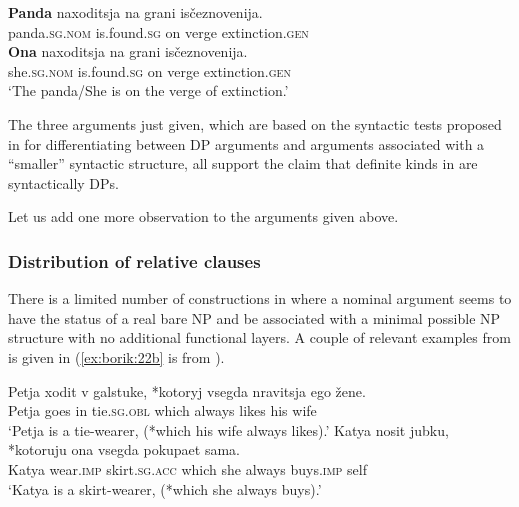 \documentclass[output=paper
,modfonts
,nonflat]{langsci/langscibook}
\begin{document}
	\ea\label{ex:borik:21}
	\ea\label{ex:borik:21a}	
	\gll \textbf{Panda}	naxoditsja		na		grani		is\v{c}eznovenija.\\
	panda.\textsc{sg.nom}		is.found.\textsc{sg} on		verge		extinction.\textsc{gen}\\
	\ex\label{ex:borik:21b}
	\gll \textbf{Ona} 	naxoditsja		na		grani		is\v{c}eznovenija.\\
	she.\textsc{sg.nom} 		is.found.\textsc{sg} on		verge		extinction.\textsc{gen}	\\
	\glt `The panda/She is on the verge of extinction.'
	\z
	\z
	
	The three arguments just given, which are based on the syntactic tests proposed in \citet{Pereltsvaig2006} for differentiating between DP arguments and arguments associated with a ``smaller'' syntactic structure, all support the claim that definite kinds in  are syntactically DPs. 
	
	Let us add one more observation to the arguments given above.
	
	\subsubsection{Distribution of relative clauses}
	
	There is a limited number of constructions in  where a nominal argument seems to have the status of a real bare NP and be associated with a minimal possible NP structure with no additional functional layers. A couple of relevant examples from  is given in  (\ref{ex:borik:22b} is from \citealt[ex. 8]{Borik2012}).
	
	\ea\label{ex:borik:22}
	\ea\label{ex:borik:22a}
	\gll Petja	 xodit v galstuke, {\op}\textnormal{*}kotoryj 	vsegda nravitsja ego \v{z}ene{\cp}.\\
	Petja	 goes in tie.\textsc{sg.obl}	{\db}{\phantom{*}}which always likes his wife\\
	\glt `Petja is a tie-wearer, (*which his wife always likes).'
	\ex\label{ex:borik:22b}
	\gll Katya nosit jubku, {\op}\textnormal{*}kotoruju	 ona	vsegda pokupaet sama{\cp}. \\
	Katya wear.\textsc{imp} skirt.\textsc{sg.acc} {\db}{\phantom{*}}which she always buys.\textsc{imp} self\\
	\glt `Katya is a skirt-wearer, (*which she always buys).'
	\z
	\z
	
\end{document}
